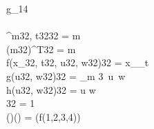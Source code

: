 \begin{FortressCode}
 g_{14} \\
  \\
 ^{m\COLON {}32, t\COLON {}32}\COLON {}32 = m \\
 (m\COLON {}32)^{T}\COLON {}32 = m \\
f(x_{}\COLON {}32, t\COLON {}32, u\COLON {}32, w\COLON {}32)\COLON {}32 = x_{}_{t} \\
g(u\COLON {}32, w\COLON {}32)\COLON {}32 = \sum\limits_{m \mathbin{\#}3}\, u\, w \\
h(u\COLON {}32, w\COLON {}32)\COLON {}32 = u \cdot w \\
\COLON {}32 = 1 \\
(\ultrathin)\COLON (\ultrathin) = \bigl(f(1,2,3,4)\bigr) \\
\end{FortressCode}
